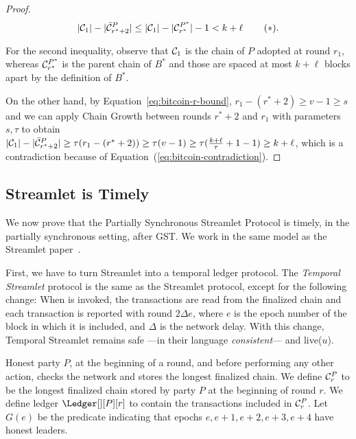 \begin{proof}

  \[
     |\mathcal{C}_1| - |\bar {\mathcal{C}}^P_{r^* + 2}| \leq
     |\mathcal{C}_1| - |\mathcal{C}^{P^*}_{r^*}| - 1 <
     k + \ell\, \label{eq:bitcoin-contradiction}\tag{$\ast$}.
  \]

  For the second inequality, observe that
  $\mathcal{C}_1$ is the chain of $P$ adopted at round $r_1$,
  whereas $\mathcal{C}^{P^*}_{r^*}$ is
  the parent chain of $B^*$ and those are spaced at most $k + \ell$ blocks
  apart by the definition of $B^*$.

  On the other hand, by Equation~\ref{eq:bitcoin-r-bound}, $r_1 - (r^* + 2) \geq v - 1 \geq s$ and
  we can apply Chain Growth between rounds $r^* + 2$ and $r_1$
  with parameters $s, \tau$ to obtain
  $|\mathcal{C}_1| - |\bar {\mathcal{C}}^P_{r^* + 2}| \geq \tau(r_1 - (r^* + 2)) \geq \tau (v - 1) \geq
  \tau (\frac{k + \ell}{\tau} + 1 - 1) \geq k + \ell$,
  which is a contradiction because of Equation~(\ref{eq:bitcoin-contradiction}).

  \Qed
\end{proof}

\subsection{Streamlet is Timely}

We now prove that the Partially Synchronous Streamlet Protocol is timely,
in the partially synchronous setting, after GST.
We work in the same model as the Streamlet paper~\cite{streamlet}.

First, we have to turn Streamlet into a temporal ledger protocol.
The \emph{Temporal Streamlet} protocol is the same as the Streamlet protocol, except
for the following change: When \rread is invoked, the transactions are
read from the finalized chain and each transaction is reported with round $2\Delta e$,
where $e$ is the epoch number of the block in which it is included, and $\Delta$ is the
network delay.
With this change, Temporal Streamlet remains safe ---in their language \emph{consistent}--- and live($u$).

Honest party $P$, at the beginning of a round, and
before performing any other action, checks the network and
stores the longest finalized chain.
We define $\mathcal{C}^P_r$ to be the longest finalized chain stored by party $P$
at the beginning of round $r$.
We define ledger $\Ledger[][P][r]$ to contain the transactions included in $\mathcal{C}^P_r$.
Let $G(e)$ be the predicate indicating that epochs $e,e+1,e+2,e+3,e+4$ have honest leaders.

